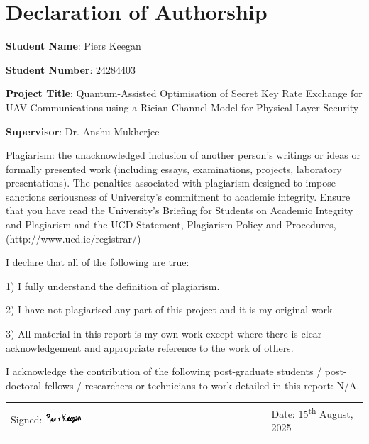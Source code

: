 \documentclass[a4paper,oneside,12pt]{book}
\title{\thesistitle}
\author{\authorname}
\numberwithin{equation}{chapter} %
\begin{document}

\setlength{\belowdisplayskip}{0pt} \setlength{\belowdisplayshortskip}{0pt}
\setlength{\abovedisplayskip}{0pt} \setlength{\abovedisplayshortskip}{0pt}

\clearpage
{}
\chapter*{Declaration of Authorship}
\textbf{Student Name}: Piers Keegan

\textbf{Student Number}: 24284403

\textbf{Project Title}: Quantum-Assisted Optimisation of Secret Key Rate Exchange for UAV Communications using a Rician Channel Model for Physical Layer Security

\textbf{Supervisor}: Dr. Anshu Mukherjee

Plagiarism: the unacknowledged inclusion of another person’s writings or ideas or formally presented
work (including essays, examinations, projects, laboratory presentations). The penalties associated with plagiarism designed to impose sanctions seriousness of University’s commitment to academic integrity.
Ensure that you have read the University’s Briefing for Students on Academic Integrity and
Plagiarism and the UCD Statement, Plagiarism Policy and Procedures, (http://www.ucd.ie/registrar/)

I declare that all of the following are true:

1) I fully understand the definition of plagiarism.

2) I have not plagiarised any part of this project and it is my original work.

3) All material in this report is my own work except where there is clear acknowledgement and appropriate reference to the work of others.

I acknowledge the contribution of the following post-graduate students / post-doctoral fellows /
researchers or technicians to work detailed in this report: N/A.

\vspace{15mm}

\begin{tabular}{@{}p{2.5in}p{2in}p{2in}@{}}
    Signed: \includegraphics[width=0.15\textwidth]{figures/cropped_signature_declaration_of_authorship.png} && Date: 15\textsuperscript{th} August, 2025 \\
\end{tabular}
\end{document}
